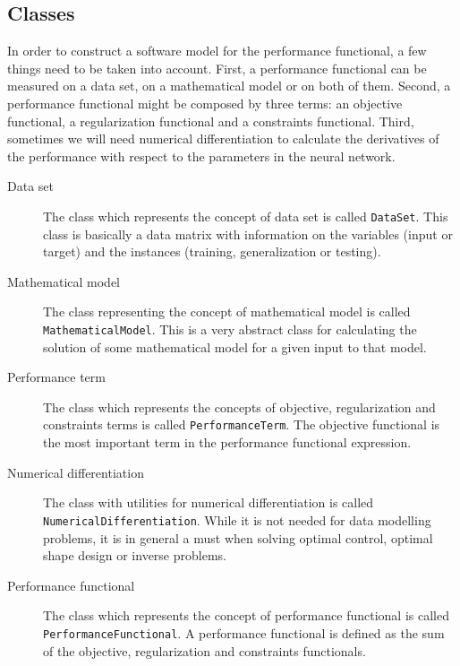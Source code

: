 \subsection*{Classes}

In order to construct a software model for the performance functional, a few things need to be taken into account. 
First, a performance functional can be measured on a data set, on a mathematical model or on both of them. 
Second, a performance functional might be composed by three terms: an objective functional, a regularization functional and a constraints functional. 
Third, sometimes we will need numerical differentiation to calculate the derivatives of the performance with respect to the parameters in the neural network.

\begin{description}

\item[Data set] The class which represents the concept of data set is called \lstinline"DataSet". This class is basically a data matrix with information on the variables (input or target) and the instances (training, generalization or testing).

\item[Mathematical model] The class representing the concept of mathematical model is called \lstinline"MathematicalModel". 
This is a very abstract class for calculating the solution of some mathematical model for a given input to that model. 

\item[Performance term] The class which represents the concepts of objective, regularization and constraints terms is called \lstinline"PerformanceTerm". 
The objective functional is the most important term in the performance functional expression. 

\item[Numerical differentiation] The class with utilities for numerical differentiation is called \lstinline"NumericalDifferentiation".
While it is not needed for data modelling problems, it is in general a must when solving optimal control, optimal shape design or inverse problems. 

\item[Performance functional] The class which represents the concept of performance functional is called \lstinline"PerformanceFunctional". 
A performance functional is defined as the sum of the objective, regularization and constraints functionals. 

\end{description}


